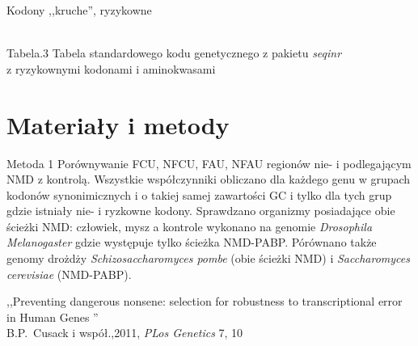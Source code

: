 \documentclass[compress,clock,xcolor=dvipsnames,hyperref={pdfpagelabels=false},final]{beamer}
\begin{document}
\begin{frame}{Kodony ,,kruche'', ryzykowne}
\begin{center}
\\
\small{Tabela.3 Tabela standardowego kodu genetycznego z pakietu {\it seqinr} \\z ryzykownymi kodonami i aminokwasami}
\end{center}
\end{frame}

\section{Materiały i metody}

\begin{frame}

\begin{block}{Metoda 1}
Porównywanie FCU, NFCU, FAU, NFAU regionów nie- i podlegającym NMD z kontrolą.
Wszystkie współczynniki obliczano dla każdego genu w grupach kodonów synonimicznych 
i o takiej samej zawartości GC i tylko dla tych grup gdzie istniały nie- i ryzkowne kodony.
 Sprawdzano organizmy posiadające obie ścieżki NMD:
 człowiek, mysz a kontrole wykonano na genomie {\it Drosophila Melanogaster} gdzie 
występuje tylko ścieżka NMD-PABP. Pórównano także genomy drożdży {\it Schizosaccharomyces pombe} (obie ścieżki NMD) 
i {\it Saccharomyces cerevisiae} (NMD-PABP).
\end{block}
\tiny{
 ,,Preventing dangerous nonsene: selection for robustness to transcriptional error in Human Genes ''\\
B.P.~Cusack i współ.,2011, {\it  PLos Genetics} 7, 10
}
\end{frame}
\end{document}
